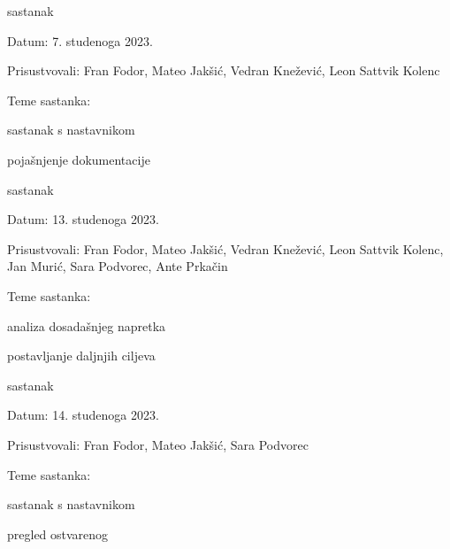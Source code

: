 \begin{packed_enum}
			\item  sastanak
			\item[] \begin{packed_item}
				\item Datum: {7. studenoga 2023.}
				\item Prisustvovali: {Fran Fodor, Mateo Jakšić, Vedran Knežević, Leon Sattvik Kolenc}
				\item Teme sastanka:
				\begin{packed_item}
					\item  sastanak s nastavnikom
					\item  pojašnjenje dokumentacije
				\end{packed_item}
			\end{packed_item}

			\item  sastanak
			\item[] \begin{packed_item}
				\item Datum: {13. studenoga 2023.}
				\item Prisustvovali: {Fran Fodor, Mateo Jakšić, Vedran Knežević, Leon Sattvik Kolenc, Jan Murić, Sara Podvorec, Ante Prkačin}
				\item Teme sastanka:
				\begin{packed_item}
					\item  analiza dosadašnjeg napretka
					\item  postavljanje daljnjih ciljeva
				\end{packed_item}
			\end{packed_item}

			\item  sastanak
			\item[] \begin{packed_item}
				\item Datum: {14. studenoga 2023.}
				\item Prisustvovali: {Fran Fodor, Mateo Jakšić, Sara Podvorec}
				\item Teme sastanka:
				\begin{packed_item}
					\item  sastanak s nastavnikom
					\item  pregled ostvarenog
				\end{packed_item}
			\end{packed_item}


			
		\end{packed_enum}
		
